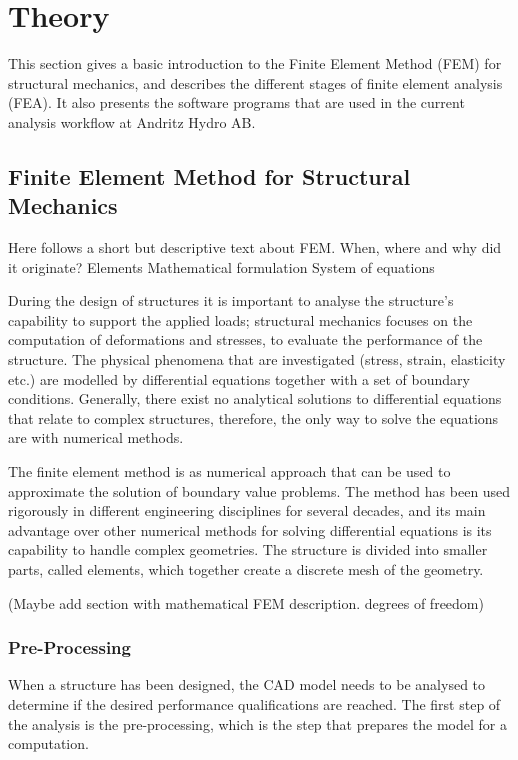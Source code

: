 
\chapter{Theory} %
\label{cha:theory}
This section gives a basic introduction to the Finite Element Method (FEM) for structural mechanics, and describes the different stages of finite element analysis (FEA). It also presents the software programs that are used in the current analysis workflow at Andritz Hydro AB.

\section{Finite Element Method for Structural Mechanics} %
\label{sec:finite_element_method_in_structural_mechanics}
Here follows a short but descriptive text about FEM.
When, where and why did it originate?
Elements
Mathematical formulation
System of equations

During the design of structures it is important to analyse the structure's capability to support the applied loads; structural mechanics focuses on the computation of deformations and stresses, to evaluate the performance of the structure. The physical phenomena that are investigated (stress, strain, elasticity etc.) are modelled by differential equations together with a set of boundary conditions. Generally, there exist no analytical solutions to differential equations that relate to complex structures, therefore, the only way to solve the equations are with numerical methods.

The finite element method is as numerical approach that can be used to approximate the solution of boundary value problems. The method has been used rigorously in different engineering disciplines for several decades, and its main advantage over other numerical methods for solving differential equations is its capability to handle complex geometries. The structure is divided into smaller parts, called elements, which together create a discrete mesh of the geometry.~\cite{ottossen92}

(Maybe add section with mathematical FEM description. degrees of freedom)

\subsection{Pre-Processing} %
\label{sub:pre_processing}
When a structure has been designed, the CAD model needs to be analysed to determine if the desired performance qualifications are reached. The first step of the analysis is the pre-processing, which is the step that prepares the model for a computation.

